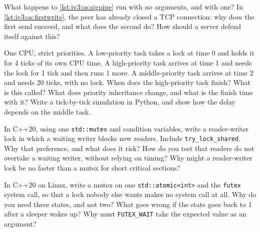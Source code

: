 \begin{question}\label{iq:iv3:operating-systems-concurrency-and-networks:28}
What happens to \cref{lst:iv3:os:sigpipe} run with no arguments, and with one? In \cref{lst:iv3:os:firstwrite}, the peer has already closed a TCP connection: why does the first send succeed, and what does the second do? How should a server defend itself against this?
\label{lst:iv3:os:sigpipe}
\label{lst:iv3:os:firstwrite}
\end{question}

\begin{question}\label{iq:iv3:operating-systems-concurrency-and-networks:29}
One CPU, strict priorities. A low-priority task takes a lock at time 0 and holds it for 4 ticks of its own CPU time. A high-priority task arrives at time 1 and needs the lock for 1 tick and then runs 1 more. A middle-priority task arrives at time 2 and needs 20 ticks, with no lock. When does the high-priority task finish? What is this called? What does priority inheritance change, and what is the finish time with it? Write a tick-by-tick simulation in Python, and show how the delay depends on the middle task.
\end{question}

\begin{question}\label{iq:iv3:operating-systems-concurrency-and-networks:30}
In C++20, using one \texttt{std::mutex} and condition variables, write a reader-writer lock in which a waiting writer blocks new readers. Include \texttt{try\_lock\_shared}. Why that preference, and what does it risk? How do you test that readers do not overtake a waiting writer, without relying on timing? Why might a reader-writer lock be no faster than a mutex for short critical sections?
\end{question}

\begin{question}\label{iq:iv3:operating-systems-concurrency-and-networks:31}
In C++20 on Linux, write a mutex on one \texttt{std::atomic<int>} and the \texttt{futex} system call, so that a lock nobody else wants makes no system call at all. Why do you need three states, and not two? What goes wrong if the state goes back to 1 after a sleeper wakes up? Why must \texttt{FUTEX\_WAIT} take the expected value as an argument?
\end{question}


